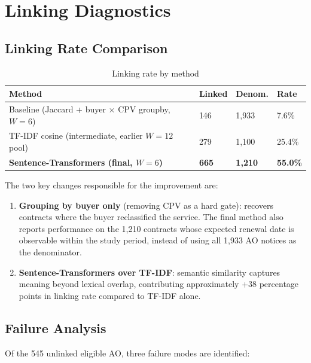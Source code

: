 \documentclass[12pt, a4paper]{article}
\begin{document}
\section{Linking Diagnostics}

\subsection{Linking Rate Comparison}

\begin{table}[h]
\centering
\caption{Linking rate by method}
\begin{tabular}{@{}P{8.7cm}R{1.6cm}R{2.2cm}R{1.5cm}@{}}
\toprule
Method & Linked & Denom. & Rate \\
\midrule
Baseline (Jaccard + buyer $\times$ CPV groupby, $W=6$) & 146 & 1,933 & 7.6\% \\
TF-IDF cosine (intermediate, earlier $W=12$ pool)       & 279 & 1,100 & 25.4\% \\
\textbf{Sentence-Transformers (final, $W=6$)}           & \textbf{665} & \textbf{1,210} & \textbf{55.0\%} \\
\bottomrule
\end{tabular}
\end{table}

The two key changes responsible for the improvement are:

\begin{enumerate}
  \item \textbf{Grouping by buyer only} (removing CPV as a hard gate): recovers
        contracts where the buyer reclassified the service. The final method
        also reports performance on the 1,210 contracts whose expected renewal
        date is observable within the study period, instead of using all 1,933
        AO notices as the denominator.
  \item \textbf{Sentence-Transformers over TF-IDF}: semantic similarity captures
        meaning beyond lexical overlap, contributing approximately +38 percentage
        points in linking rate compared to TF-IDF alone.
\end{enumerate}

\subsection{Failure Analysis}

Of the 545 unlinked eligible AO, three failure modes are identified:
\end{document}
